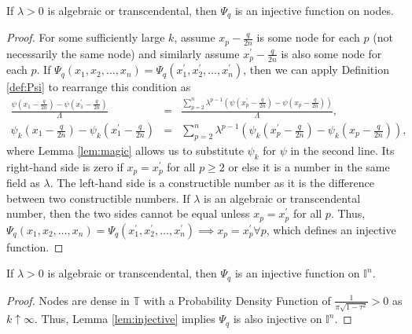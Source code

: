 \begin{lemma}
  \label{lem:injective}
  If $\lambda > 0$ is algebraic or transcendental, then $\Psi_q$ is an injective function on nodes.
\end{lemma}
\begin{proof}
  For some sufficiently large $k$, assume $x_p - \frac{q}{2n}$ is some node for each $p$ (not necessarily the same node) and similarly assume $x_p^\prime - \frac{q}{2n}$ is also some node for each $p$. If $\Psi_q\left(x_1, x_2, \dots, x_n\right) = \Psi_q\left(x_1^\prime, x_2^\prime, \dots, x_n^\prime\right)$, then we can apply Definition \ref{def:Psi} to rearrange this condition as
  \begin{eqnarray*}
      \frac{\psi\left(x_1 - \frac{q}{2n}\right) - \psi\left(x_1^\prime - \frac{q}{2n}\right)}{\Lambda} &=& \frac{\sum\limits_{p = 2}^n\lambda^{p - 1} \left(\psi\left(x_p^\prime - \frac{q}{2n}\right) - \psi\left(x_p - \frac{q}{2n}\right)\right)}{\Lambda}, \\
      \psi_k\left(x_1 - \frac{q}{2n}\right) - \psi_k\left(x_1^\prime - \frac{q}{2n}\right) &=& \sum\limits_{p = 2}^n\lambda^{p - 1} \left(\psi_k\left(x_p^\prime - \frac{q}{2n}\right) - \psi_k\left(x_p - \frac{q}{2n}\right)\right),
  \end{eqnarray*}
  where Lemma \ref{lem:magic} allows us to substitute $\psi_k$ for $\psi$ in the second line. Its right-hand side is zero if $x_p = x_p^\prime$ for all $p \geq 2$ or else it is a number in the same field as $\lambda$. The left-hand side is a constructible number as it is the difference between two constructible numbers. If $\lambda$ is an algebraic or transcendental number, then the two sides cannot be equal unless $x_p = x_p^\prime$ for all $p$. Thus, $\Psi_q\left(x_1, x_2, \dots, x_n\right) = \Psi_q\left(x_1^\prime, x_2^\prime, \dots, x_n^\prime\right) \implies x_p = x_p^\prime \forall p$, which defines an injective function.
\end{proof}

\begin{proposition}
  \label{prop:injective}
  If $\lambda > 0$ is algebraic or transcendental, then $\Psi_q$ is an injective function on $\mathbb{I}^n$.
\end{proposition}
\begin{proof}
  Nodes are dense in $\mathbb{T}$ with a Probability Density Function of $\frac{1}{\pi \sqrt{1 - \tau^2}} > 0$ as $k \uparrow \infty$. Thus, Lemma \ref{lem:injective} implies $\Psi_q$ is also injective on $\mathbb{I}^n$.
\end{proof}

